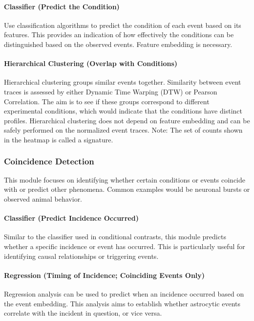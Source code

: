 \paragraph{Classifier (Predict the Condition)}
Use classification algorithms to predict the condition of each event based on its features. This provides an indication of how effectively the conditions can be distinguished based on the observed events. Feature embedding is necessary.


\paragraph{Hierarchical Clustering (Overlap with Conditions)}
Hierarchical clustering groups similar events together. Similarity between event traces is assessed by either Dynamic Time Warping (DTW) or Pearson Correlation. The aim is to see if these groups correspond to different experimental conditions, which would indicate that the conditions have distinct profiles. Hierarchical clustering does not depend on feature embedding and can be safely performed on the normalized event traces. Note: The set of counts shown in the heatmap is called a signature.


\subsubsection{Coincidence Detection}
This module focuses on identifying whether certain conditions or events coincide with or predict other phenomena. Common examples would be neuronal bursts or observed animal behavior.

\paragraph{Classifier (Predict Incidence Occurred)}
Similar to the classifier used in conditional contrasts, this module predicts whether a specific incidence or event has occurred. This is particularly useful for identifying causal relationships or triggering events.


\paragraph{Regression (Timing of Incidence; Coinciding Events Only)}
Regression analysis can be used to predict when an incidence occurred based on the event embedding. This analysis aims to establish whether astrocytic events correlate with the incident in question, or vice versa.

